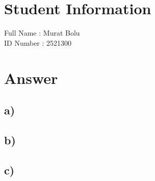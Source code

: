 \documentclass[12pt]{article}
\begin{document}
\section*{Student Information }
Full Name : Murat Bolu \\
ID Number : 2521300 \\

\section*{Answer}

\subsection*{a)}

\subsection*{b)}

\subsection*{c)}
\end{document}
